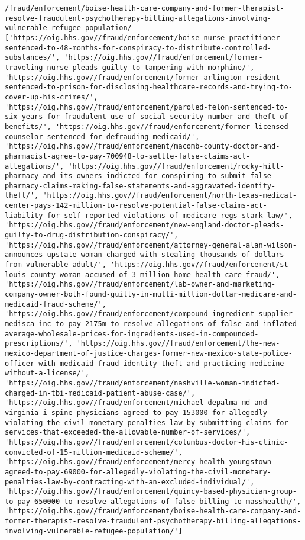 \documentclass[
  letterpaper,
  DIV=11,
  numbers=noendperiod]{scrartcl}
\begin{document}
\begin{verbatim}
/fraud/enforcement/boise-health-care-company-and-former-therapist-resolve-fraudulent-psychotherapy-billing-allegations-involving-vulnerable-refugee-population/
['https://oig.hhs.gov//fraud/enforcement/boise-nurse-practitioner-sentenced-to-48-months-for-conspiracy-to-distribute-controlled-substances/', 'https://oig.hhs.gov//fraud/enforcement/former-traveling-nurse-pleads-guilty-to-tampering-with-morphine/', 'https://oig.hhs.gov//fraud/enforcement/former-arlington-resident-sentenced-to-prison-for-disclosing-healthcare-records-and-trying-to-cover-up-his-crimes/', 'https://oig.hhs.gov//fraud/enforcement/paroled-felon-sentenced-to-six-years-for-fraudulent-use-of-social-security-number-and-theft-of-benefits/', 'https://oig.hhs.gov//fraud/enforcement/former-licensed-counselor-sentenced-for-defrauding-medicaid/', 'https://oig.hhs.gov//fraud/enforcement/macomb-county-doctor-and-pharmacist-agree-to-pay-700948-to-settle-false-claims-act-allegations/', 'https://oig.hhs.gov//fraud/enforcement/rocky-hill-pharmacy-and-its-owners-indicted-for-conspiring-to-submit-false-pharmacy-claims-making-false-statements-and-aggravated-identity-theft/', 'https://oig.hhs.gov//fraud/enforcement/north-texas-medical-center-pays-142-million-to-resolve-potential-false-claims-act-liability-for-self-reported-violations-of-medicare-regs-stark-law/', 'https://oig.hhs.gov//fraud/enforcement/new-england-doctor-pleads-guilty-to-drug-distribution-conspiracy/', 'https://oig.hhs.gov//fraud/enforcement/attorney-general-alan-wilson-announces-upstate-woman-charged-with-stealing-thousands-of-dollars-from-vulnerable-adult/', 'https://oig.hhs.gov//fraud/enforcement/st-louis-county-woman-accused-of-3-million-home-health-care-fraud/', 'https://oig.hhs.gov//fraud/enforcement/lab-owner-and-marketing-company-owner-both-found-guilty-in-multi-million-dollar-medicare-and-medicaid-fraud-scheme/', 'https://oig.hhs.gov//fraud/enforcement/compound-ingredient-supplier-medisca-inc-to-pay-2175m-to-resolve-allegations-of-false-and-inflated-average-wholesale-prices-for-ingredients-used-in-compounded-prescriptions/', 'https://oig.hhs.gov//fraud/enforcement/the-new-mexico-department-of-justice-charges-former-new-mexico-state-police-officer-with-medicaid-fraud-identity-theft-and-practicing-medicine-without-a-license/', 'https://oig.hhs.gov//fraud/enforcement/nashville-woman-indicted-charged-in-tbi-medicaid-patient-abuse-case/', 'https://oig.hhs.gov//fraud/enforcement/michael-depalma-md-and-virginia-i-spine-physicians-agreed-to-pay-153000-for-allegedly-violating-the-civil-monetary-penalties-law-by-submitting-claims-for-services-that-exceeded-the-allowable-number-of-services/', 'https://oig.hhs.gov//fraud/enforcement/columbus-doctor-his-clinic-convicted-of-15-million-medicaid-scheme/', 'https://oig.hhs.gov//fraud/enforcement/mercy-health-youngstown-agreed-to-pay-69000-for-allegedly-violating-the-civil-monetary-penalties-law-by-contracting-with-an-excluded-individual/', 'https://oig.hhs.gov//fraud/enforcement/quincy-based-physician-group-to-pay-650000-to-resolve-allegations-of-false-billing-to-masshealth/', 'https://oig.hhs.gov//fraud/enforcement/boise-health-care-company-and-former-therapist-resolve-fraudulent-psychotherapy-billing-allegations-involving-vulnerable-refugee-population/']

\end{verbatim}
\end{document}
